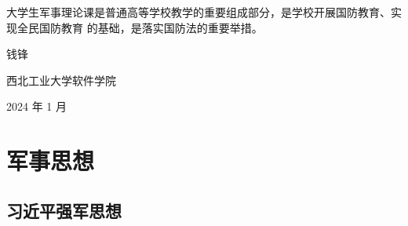 \documentclass[10pt, UTF8]{ctexbook} %
\begin{document}
\quad\quad
大学生军事理论课是普通高等学校教学的重要组成部分，是学校开展国防教育、实现全民国防教育
的基础，是落实国防法的重要举措。

\begin{flushright}
    \kaishu
    钱锋

    西北工业大学软件学院

    2024 年 1 月
\end{flushright}

\newpage
\thispagestyle{empty}

\pagestyle{plain}
{\small \tableofcontents}
\newpage
\thispagestyle{empty}

\makeatletter
\let\ps@plain\ps@empty
\makeatother


\cleardoublepage %
\pagestyle{fancy}
\setcounter{page}{1} %


\chapter{军事思想}

\section{习近平强军思想}
\end{document}
